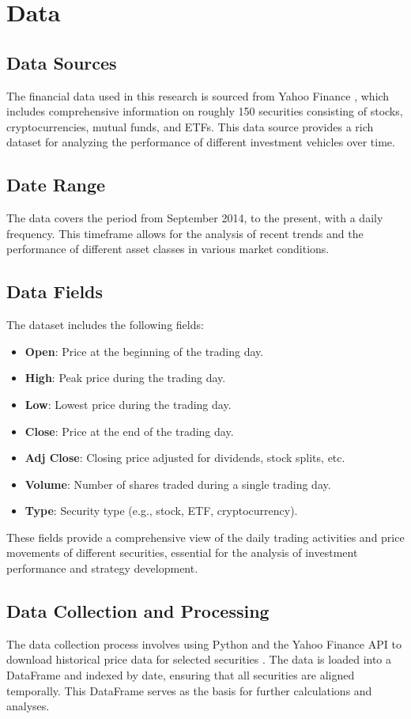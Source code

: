 \section{Data}
\subsection{Data Sources}
The financial data used in this research is sourced from Yahoo Finance \citep{yfinance}, which includes comprehensive information on roughly 150 securities consisting of stocks, cryptocurrencies, mutual funds, and ETFs. This data source provides a rich dataset for analyzing the performance of different investment vehicles over time.

\subsection{Date Range}
The data covers the period from September 2014, to the present, with a daily frequency. This timeframe allows for the analysis of recent trends and the performance of different asset classes in various market conditions.

\subsection{Data Fields}
The dataset includes the following fields:
\begin{itemize}
    \item \textbf{Open}: Price at the beginning of the trading day.
    \item \textbf{High}: Peak price during the trading day.
    \item \textbf{Low}: Lowest price during the trading day.
    \item \textbf{Close}: Price at the end of the trading day.
    \item \textbf{Adj Close}: Closing price adjusted for dividends, stock splits, etc.
    \item \textbf{Volume}: Number of shares traded during a single trading day.
    \item \textbf{Type}: Security type (e.g., stock, ETF, cryptocurrency).
\end{itemize}

These fields provide a comprehensive view of the daily trading activities and price movements of different securities, essential for the analysis of investment performance and strategy development.

\subsection{Data Collection and Processing}
The data collection process involves using Python and the Yahoo Finance API to download historical price data for selected securities \citep{yfinance}. The data is loaded into a DataFrame and indexed by date, ensuring that all securities are aligned temporally. This DataFrame serves as the basis for further calculations and analyses.

